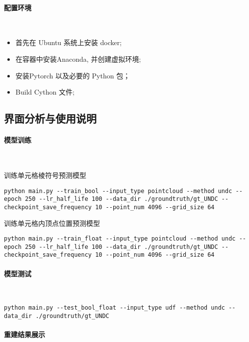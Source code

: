 \paragraph{配置环境}~{}

\begin{itemize}
	\item 首先在 Ubuntu 系统上安装 docker;
	\item 在容器中安装Anaconda, 并创建虚拟环境;
	\item 安装Pytorch 以及必要的 Python 包；
	\item Build Cython 文件;
\end{itemize}

\subsection{界面分析与使用说明}







\paragraph{模型训练}~{}

训练单元格棱符号预测模型
\lstset{language=bash}
\begin{lstlisting}
python main.py --train_bool --input_type pointcloud --method undc --epoch 250 --lr_half_life 100 --data_dir ./groundtruth/gt_UNDC --checkpoint_save_frequency 10 --point_num 4096 --grid_size 64 
\end{lstlisting}

训练单元格内顶点位置预测模型
\lstset{language=bash}
\begin{lstlisting}
python main.py --train_float --input_type pointcloud --method undc --epoch 250 --lr_half_life 100 --data_dir ./groundtruth/gt_UNDC --checkpoint_save_frequency 10 --point_num 4096 --grid_size 64
\end{lstlisting}
\paragraph{模型测试}~{}

\lstset{language=bash}
\begin{lstlisting}
python main.py --test_bool_float --input_type udf --method undc --data_dir ./groundtruth/gt_UNDC
\end{lstlisting}
\paragraph{重建结果展示}

